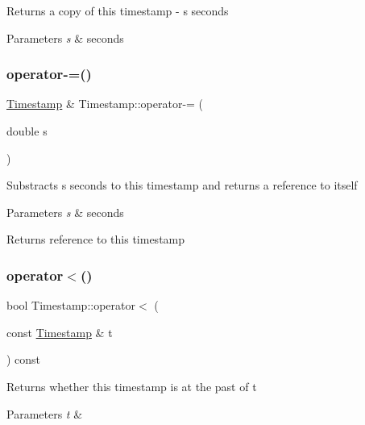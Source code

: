 Returns a copy of this timestamp -\/ s seconds 
\begin{DoxyParams}{Parameters}
{\em s} & seconds \\
\hline
\end{DoxyParams}
\mbox{\label{class_d_utils_1_1_timestamp_a775ece4a7fab156430da57da985a8965}} 
\subsubsection{\texorpdfstring{operator-\/=()}{operator-=()}}
{\footnotesize\ttfamily \mbox{\hyperlink{class_d_utils_1_1_timestamp}{Timestamp}} \& Timestamp\+::operator-\/= (\begin{DoxyParamCaption}\item[{double}]{s }\end{DoxyParamCaption})}

Substracts s seconds to this timestamp and returns a reference to itself 
\begin{DoxyParams}{Parameters}
{\em s} & seconds \\
\hline
\end{DoxyParams}
\begin{DoxyReturn}{Returns}
reference to this timestamp 
\end{DoxyReturn}
\mbox{\label{class_d_utils_1_1_timestamp_a5ec33cb0b7230946e02e4afa050c445c}} 
\subsubsection{\texorpdfstring{operator$<$()}{operator<()}}
{\footnotesize\ttfamily bool Timestamp\+::operator$<$ (\begin{DoxyParamCaption}\item[{const \mbox{\hyperlink{class_d_utils_1_1_timestamp}{Timestamp}} \&}]{t }\end{DoxyParamCaption}) const}

Returns whether this timestamp is at the past of t 
\begin{DoxyParams}{Parameters}
{\em t} & \\
\hline
\end{DoxyParams}
\mbox{\label{class_d_utils_1_1_timestamp_a4fe0620f1df3aaa4d30ce9a8ba989f77}} 
